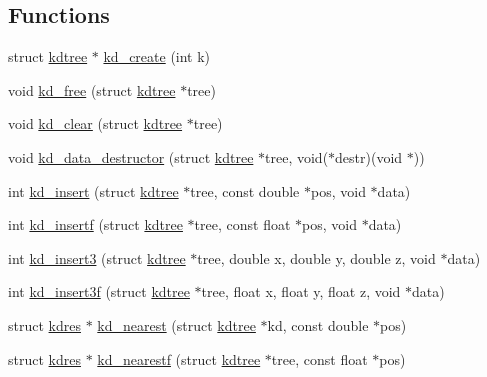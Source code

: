 \subsection*{\-Functions}
\begin{DoxyCompactItemize}
\item 
struct \hyperlink{a00011}{kdtree} $\ast$ \hyperlink{a00013_a0267f17ca84a70322af662b16a625c16_a0267f17ca84a70322af662b16a625c16}{kd\-\_\-create} (int k)
\item 
void \hyperlink{a00013_aafdee4d5c129970e12fd9fe6da45d6d1_aafdee4d5c129970e12fd9fe6da45d6d1}{kd\-\_\-free} (struct \hyperlink{a00011}{kdtree} $\ast$tree)
\item 
void \hyperlink{a00013_a354bb35c5b031992cd0972dc53ad5d4f_a354bb35c5b031992cd0972dc53ad5d4f}{kd\-\_\-clear} (struct \hyperlink{a00011}{kdtree} $\ast$tree)
\item 
void \hyperlink{a00013_af2b7a413e4a0daf4add90cf982b954ec_af2b7a413e4a0daf4add90cf982b954ec}{kd\-\_\-data\-\_\-destructor} (struct \hyperlink{a00011}{kdtree} $\ast$tree, void($\ast$destr)(void $\ast$))
\item 
int \hyperlink{a00013_afafddbe0ccd0ca2c41917fb6d79f3392_afafddbe0ccd0ca2c41917fb6d79f3392}{kd\-\_\-insert} (struct \hyperlink{a00011}{kdtree} $\ast$tree, const double $\ast$pos, void $\ast$data)
\item 
int \hyperlink{a00013_ab64899a430280fc8affa205d82d07d10_ab64899a430280fc8affa205d82d07d10}{kd\-\_\-insertf} (struct \hyperlink{a00011}{kdtree} $\ast$tree, const float $\ast$pos, void $\ast$data)
\item 
int \hyperlink{a00013_a354954a360619c49f086402676b36e35_a354954a360619c49f086402676b36e35}{kd\-\_\-insert3} (struct \hyperlink{a00011}{kdtree} $\ast$tree, double x, double y, double z, void $\ast$data)
\item 
int \hyperlink{a00013_a9875b355df53d4545843f7471abb04f4_a9875b355df53d4545843f7471abb04f4}{kd\-\_\-insert3f} (struct \hyperlink{a00011}{kdtree} $\ast$tree, float x, float y, float z, void $\ast$data)
\item 
struct \hyperlink{a00010}{kdres} $\ast$ \hyperlink{a00013_a0ef52ad10ed0e7a1cf7b773165810361_a0ef52ad10ed0e7a1cf7b773165810361}{kd\-\_\-nearest} (struct \hyperlink{a00011}{kdtree} $\ast$kd, const double $\ast$pos)
\item 
struct \hyperlink{a00010}{kdres} $\ast$ \hyperlink{a00013_a62c3e2c5f4ee976a504d9e54080e332d_a62c3e2c5f4ee976a504d9e54080e332d}{kd\-\_\-nearestf} (struct \hyperlink{a00011}{kdtree} $\ast$tree, const float $\ast$pos)

\end{DoxyCompactItemize}
